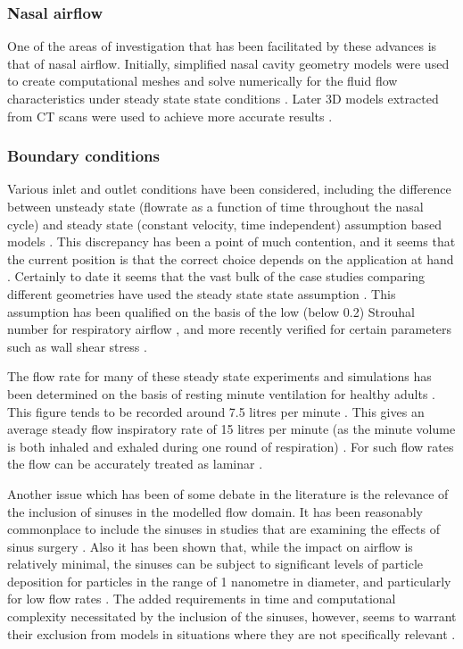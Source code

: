 \subsubsection*{Nasal airflow}
One of the areas of investigation that has been facilitated by these advances is that of nasal airflow. Initially, simplified nasal cavity geometry models were used to create computational meshes and solve numerically for the fluid flow characteristics under steady state state conditions \cite{Keyhani1995, Hahn1993}. Later 3D models extracted from CT scans were used to achieve more accurate results \cite{Martonen2002}. 

\subsubsection*{Boundary conditions}
Various inlet and outlet conditions have been considered, including the difference between unsteady state  (flowrate as a function of time throughout the nasal cycle) \cite{Shi2006} and steady state (constant velocity, time independent) assumption based models \cite{Wen2008}. This discrepancy has been a point of much contention, and it seems that the current position is that the correct choice depends on the application at hand \cite{Doorly2008c}. Certainly to date it seems that the vast bulk of the case studies comparing different geometries have used the steady state state assumption \cite{Xi2012, Zhu2011, Garcia2007, Doorly2008c, Keyhani1995, Subramaniam1998, Wen2008}. This assumption has been qualified on the basis of the low (below 0.2) Strouhal number for respiratory airflow \cite{Keyhani1995}, and more recently verified for certain parameters such as wall shear stress \cite{Doorly2008c}.


The flow rate for many of these steady state experiments and simulations has been determined on the basis of resting minute ventilation for healthy adults \cite{Subramaniam1998, Wen2008}. This figure tends to be recorded around 7.5 litres per minute \cite{Chaya2006, Tobin1983}. This gives an average steady flow inspiratory rate of 15 litres per minute (as the minute volume is both inhaled and exhaled during one round of respiration) \cite{Subramaniam1998}. For such flow rates the flow can be accurately treated as laminar \cite{Doorly2008c, Hahn1993}.


Another issue which has been of some debate in the literature is the relevance of the inclusion of sinuses in the modelled flow domain. It has been reasonably commonplace to include the sinuses in studies that are examining the effects of sinus surgery \cite{Xiong2008a, Lindemann2005}. Also it has been shown that, while the impact on airflow is relatively minimal, the sinuses can be subject to significant levels of particle deposition for particles in the range of 1 nanometre in diameter, and particularly for low flow rates \cite{Ge2012}. The added requirements in time and computational complexity necessitated by the inclusion of the sinuses, however, seems to warrant their exclusion from models in situations where they are not specifically relevant \cite{Doorly2008c}.


